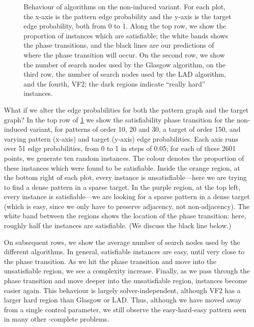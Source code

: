 \documentclass[letterpaper]{article}
\begin{document}
\begin{figure}[tb]
    \setlength{\abovecaptionskip}{0pt}
    
    \caption{Behaviour of algorithms on the non-induced variant. For each plot, the x-axis is the
        pattern edge probability and the y-axis is the target edge probability, both from 0 to 1.
        Along the top row, we show the proportion of instances which are satisfiable; the white
        bands shows the phase transitions, and the black lines are our predictions of where the
        phase transition will occur. On the second row, we show the number of search nodes used by the
        Glasgow algorithm, on the third row, the number of search nodes used by the LAD algorithm, and the
        fourth, VF2; the dark regions indicate ``really hard'' instances.}
    \label{figure:non-induced}
\end{figure}

What if we alter the edge probabilities for both the pattern graph and the target graph?  In the top
row of \cref{figure:non-induced} we show the satisfiability phase transition for the non-induced
variant, for patterns of order 10, 20 and 30, a target of order 150, and varying pattern (x-axis)
and target (y-axis) edge probabilities. Each axis runs over 51 edge probabilities, from 0 to 1 in
steps of 0.05; for each of these 2601 points, we generate ten random instances. The colour denotes
the proportion of these instances which were found to be satisfiable.  Inside the orange region, at
the bottom right of each plot, every instance is unsatisfiable---here we are trying to find a dense
pattern in a sparse target. In the purple region, at the top left, every instance is
satisfiable---we are looking for a sparse pattern in a dense target (which is easy, since we only
have to preserve adjacency, not non-adjacency). The white band between the regions shows the
location of the phase transition: here, roughly half the instances are satisfiable. (We discuss the
black line below.)

On subsequent rows, we show the average number of search nodes used by the different algorithms. In
general, satisfiable instances are easy, until very close to the phase transition. As we hit the
phase transition and move into the unsatisfiable region, we see a complexity increase. Finally, as
we pass through the phase transition and move deeper into the unsatisfiable region, instances become
easier again. This behaviour is largely solver-independent, although VF2 has a larger hard region
than Glasgow or LAD. Thus, although we have moved away from a single control parameter, we still
observe the easy-hard-easy pattern seen in many other \NP-complete problems.
\end{document}
